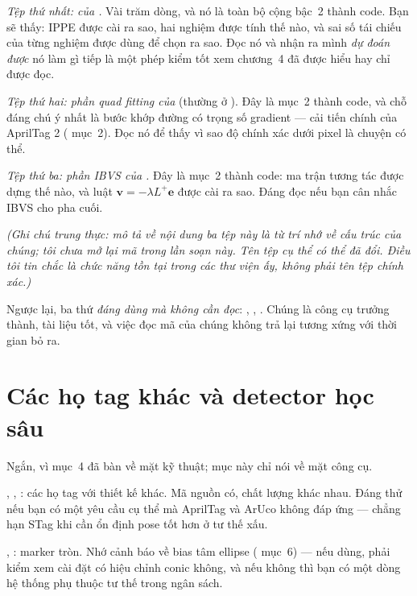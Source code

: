 \documentclass[../../marker.tex]{subfiles}
\begin{document}
\emph{Tệp thứ nhất:  của .} Vài trăm dòng, và nó là toàn bộ  cộng  bậc~2 thành code. Bạn sẽ thấy: IPPE được cài ra sao, hai nghiệm được tính thế nào, và sai số tái chiếu của từng nghiệm được dùng để chọn ra sao. Đọc nó và nhận ra mình \emph{dự đoán được} nó làm gì tiếp là một phép kiểm tốt xem chương~4 đã được hiểu hay chỉ được đọc.

\emph{Tệp thứ hai: phần quad fitting của } (thường ở ). Đây là  mục~2 thành code, và chỗ đáng chú ý nhất là bước khớp đường có trọng số gradient --- cải tiến chính của AprilTag 2 ( mục~2). Đọc nó để thấy vì sao độ chính xác dưới pixel là chuyện có thể.

\emph{Tệp thứ ba: phần IBVS của .} Đây là  mục~2 thành code: ma trận tương tác được dựng thế nào, và luật \(\mathbf{v} = -\lambda L^{+}\mathbf{e}\) được cài ra sao. Đáng đọc nếu bạn cân nhắc IBVS cho pha cuối.

\emph{(Ghi chú trung thực: mô tả về nội dung ba tệp này là từ trí nhớ về cấu trúc của chúng; tôi \emph{chưa} mở lại mã trong lần soạn này. Tên tệp cụ thể có thể đã đổi. Điều tôi tin chắc là \emph{chức năng} tồn tại trong các thư viện ấy, không phải tên tệp chính xác.)}

Ngược lại, ba thứ \emph{đáng dùng mà không cần đọc}: , , . Chúng là công cụ trưởng thành, tài liệu tốt, và việc đọc mã của chúng không trả lại tương xứng với thời gian bỏ ra.

\section{Các họ tag khác và detector học sâu}

Ngắn, vì  mục~4 đã bàn về mặt kỹ thuật; mục này chỉ nói về mặt công cụ.

 \cite{benligiray2019stag},  \cite{yu2021topotag},  \cite{degol2017chromatag}: các họ tag với thiết kế khác. Mã nguồn có, chất lượng khác nhau. Đáng thử nếu bạn có một yêu cầu cụ thể mà AprilTag và ArUco không đáp ứng --- chẳng hạn STag khi cần ổn định pose tốt hơn ở tư thế xấu.

 \cite{calvet2016cctag},  \cite{krajnik2014whycon}: marker tròn. Nhớ cảnh báo về bias tâm ellipse ( mục~6) --- nếu dùng, phải kiểm xem cài đặt có hiệu chỉnh conic không, và nếu không thì bạn có một dòng hệ thống phụ thuộc tư thế trong ngân sách.
\end{document}

